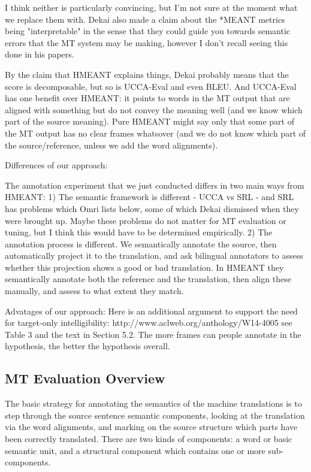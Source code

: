 \documentclass[11pt]{article}
\begin{document}
I think neither is particularly convincing, but I'm not sure at the moment what we replace them with. Dekai also made a claim about the *MEANT metrics being "interpretable" in the sense that they could guide you towards semantic errors that the MT system may be making, however I don't recall seeing this done in his papers. 


By the claim that HMEANT explains things, Dekai probably means that the score is decomposable, but so is UCCA-Eval and even BLEU. And UCCA-Eval has one benefit over HMEANT: it points to words in the MT output that are aligned with something but do not convey the meaning well (and we know which part of the source meaning). Pure HMEANT might say only that some part of the MT output has no clear frames whatsover (and we do not know which part of the source/reference, unless we add the word alignments).




Differences of our approach:

The annotation experiment that we just conducted differs in two main ways from HMEANT:
1) The semantic framework is different - UCCA vs SRL - and SRL has problems which Omri lists below, some of which Dekai dismissed when they were brought up. Maybe these problems do not matter for MT evaluation or tuning, but I think this would have to be determined empirically.
2) The annotation process is different. We semantically annotate the source, then automatically project it to the translation, and ask bilingual annotators to assess whether this projection shows a good or bad translation. In HMEANT they semantically annotate both the reference and the translation, then align these manually, and assess to what extent they match.

Advatages of our approach:
Here is an additional argument to support the need for target-only intelligibility:
http://www.aclweb.org/anthology/W14-4005
see Table  3 and the text in Section 5.2.
The more frames can people annotate in the hypothesis, the better the hypothesis overall.



\subsection{MT Evaluation Overview}

The basic strategy for annotating the semantics of the machine translations is to step through the source sentence semantic 
components, looking at the translation via the word alignments, and marking on the source structure
which parts have 
been correctly translated.
There are two kinds of components: a word or basic semantic unit, and a structural component which contains one or more sub-components. 
\end{document}
